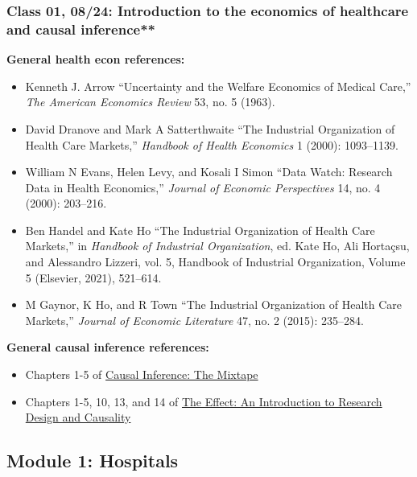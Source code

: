 \documentclass[11pt,]{article}
\providecommand{\tightlist}{%
  \setlength{\itemsep}{0pt}\setlength{\parskip}{0pt}}
\begin{document}
\hypertarget{class-01-0824-introduction-to-the-economics-of-healthcare-and-causal-inference}{%
\subsubsection{Class 01, 08/24: Introduction to the economics of
healthcare and causal
inference**}\label{class-01-0824-introduction-to-the-economics-of-healthcare-and-causal-inference}}

\textbf{General health econ references:}

\begin{itemize}
\tightlist
\item
  Kenneth J. Arrow {``Uncertainty and the {Welfare} {Economics} of
  {Medical} {Care},''} \emph{The American Economics Review} 53, no. 5
  (1963).
\item
  David Dranove and Mark A Satterthwaite {``The Industrial Organization
  of Health Care Markets,''} \emph{Handbook of Health Economics} 1
  (2000): 1093--1139.
\item
  William N Evans, Helen Levy, and Kosali I Simon {``Data Watch:
  {Research} Data in Health Economics,''} \emph{Journal of Economic
  Perspectives} 14, no. 4 (2000): 203--216.
\item
  Ben Handel and Kate Ho {``The Industrial Organization of Health Care
  Markets,''} in \emph{Handbook of {Industrial} {Organization}}, ed.
  Kate Ho, Ali Hortaçsu, and Alessandro Lizzeri, vol. 5, Handbook of
  {Industrial} {Organization}, {Volume} 5 (Elsevier, 2021), 521--614.
\item
  M Gaynor, K Ho, and R Town {``The {Industrial} {Organization} of
  {Health} {Care} {Markets},''} \emph{Journal of Economic Literature}
  47, no. 2 (2015): 235--284.
\end{itemize}

\textbf{General causal inference references:}

\begin{itemize}
\tightlist
\item
  Chapters 1-5 of \href{https://mixtape.scunning.com/}{Causal Inference:
  The Mixtape}
\item
  Chapters 1-5, 10, 13, and 14 of \href{https://theeffectbook.net/}{The
  Effect: An Introduction to Research Design and Causality}
\end{itemize}

\hypertarget{module-1-hospitals}{%
\subsection{Module 1: Hospitals}\label{module-1-hospitals}}
\end{document}
